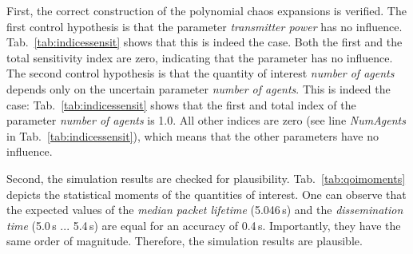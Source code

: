 First, the correct construction of the polynomial chaos expansions is verified. The first control hypothesis is that the parameter \textit{transmitter power} has no influence. Tab.~\ref{tab:indicessensit} shows that this is indeed the case. Both the first and the total sensitivity index are zero, indicating that the parameter has no influence. 
The second control hypothesis is that the quantity of interest \textit{number of agents} depends only on the uncertain parameter \textit{number of agents}. This is indeed the case: Tab.~\ref{tab:indicessensit} shows that the first and total index of the parameter \textit{number of agents} is 1.0. All other indices are zero (see line \textit{NumAgents} in Tab.~\ref{tab:indicessensit}), which means that the other parameters have no influence. 

Second, the simulation results are checked for plausibility. Tab.~\ref{tab:qoimoments} depicts the statistical moments of the quantities of interest. One can observe that the expected values of the \textit{median packet lifetime} (5.046\,s) and the \textit{dissemination time} (5.0\,s ... 5.4\,s) are equal for an accuracy of 0.4\,s. Importantly, they have the same order of magnitude. Therefore, the simulation results are plausible.

